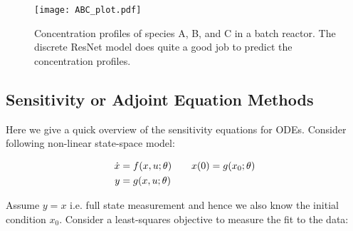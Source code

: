 \documentclass[fontsize=11pt]{article}
\theoremstyle{definition}
\begin{document}
\begin{figure}
    \centering
    \texttt{[image: ABC\_plot.pdf]} 
    \caption{Concentration profiles of species A, B, and C in a batch reactor. The 
    discrete ResNet model does quite a good job to predict the concentration profiles.}
    \label{fig:resnet}
\end{figure}

\subsection{Sensitivity or Adjoint Equation Methods}
\label{sec:sens}

Here we give a quick overview of the sensitivity equations for ODEs. Consider following
non-linear state-space model:

\begin{align}
    \dot{x} &= f(x, u; \theta) \qquad x(0) = g(x_0; \theta)\notag \\
    y &= g(x, u; \theta)
\end{align}

Assume $y=x$ i.e. full state measurement and hence we also know the initial condition
$x_0$. Consider a least-squares objective to measure the fit to the data:
\end{document}
